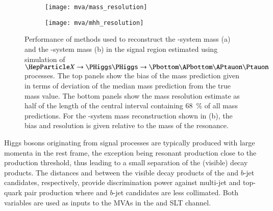 


\begin{figure}[htbp]
  \centering

  \begin{subfigure}[t]{.5\textwidth}
    \centering
    \texttt{[image: mva/mass\_resolution]}
    \label{fig:mass_reconstruction_H}
  \end{subfigure}\hfill%
  \begin{subfigure}[t]{.5\textwidth}
    \centering
    \texttt{[image: mva/mhh\_resolution]}
    \label{fig:mass_reconstruction_HH}
  \end{subfigure}

  \caption[Resolution and bias of the $H$- and $HH$-system mass reconstruction
  in the \hadhad SR.]{Performance of methods used to reconstruct the
    \PHiggs-system mass (a) and the \HH-system mass (b) in the \hadhad signal
    region estimated using simulation of $\PX \ra \HH \ra \bbtautau$
    processes. The top panels show the bias of the mass prediction given in
    terms of deviation of the median mass prediction from the true mass
    value. The bottom panels show the mass resolution estimate as half of the
    length of the central interval containing \SI{68}{\percent} of all mass
    predictions. For the \HH-system mass reconstruction shown in (b), the bias
    and resolution is given relative to the mass of the resonance.}%
  \label{fig:mass_reconstruction}
\end{figure}

Higgs bosons originating from signal processes are typically produced
with large momenta in the \HH rest frame, the exception being resonant
\HH production \mX close to the \HH production threshold, thus leading
to a small separation of the (visible) \PHiggs decay products. The
distances \dRtautau and \dRbb between the visible decay products of
the \tauleptons and $b$-jet candidates, respectively, provide
discrimination power against multi-jet and top-quark pair production
where \tauleptons and $b$-jet candidates are less collimated. Both
variables are used as inputs to the MVAs in the \hadhad and \lephad
SLT channel.

